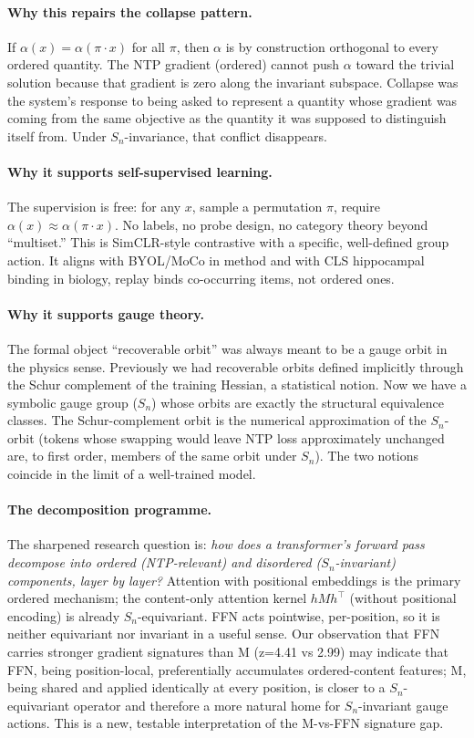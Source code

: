 \documentclass[11pt, a4paper]{article}
\theoremstyle{plain}
\theoremstyle{definition}
\theoremstyle{remark}
\begin{document}
\paragraph{Why this repairs the collapse pattern.}
If $\alpha(x) = \alpha(\pi \cdot x)$ for all $\pi$, then $\alpha$ is by construction orthogonal to every ordered quantity.
The NTP gradient (ordered) cannot push $\alpha$ toward the trivial solution because that gradient is zero along the invariant subspace.
Collapse was the system's response to being asked to represent a quantity whose gradient was coming from the same objective as the quantity it was supposed to distinguish itself from.
Under $S_n$-invariance, that conflict disappears.

\paragraph{Why it supports self-supervised learning.}
The supervision is free: for any $x$, sample a permutation $\pi$, require $\alpha(x) \approx \alpha(\pi \cdot x)$.
No labels, no probe design, no category theory beyond ``multiset.''
This is SimCLR-style contrastive with a specific, well-defined group action.
It aligns with BYOL/MoCo in method and with CLS hippocampal binding in biology, replay binds co-occurring items, not ordered ones.

\paragraph{Why it supports gauge theory.}
The formal object ``recoverable orbit'' was always meant to be a gauge orbit in the physics sense.
Previously we had recoverable orbits defined implicitly through the Schur complement of the training Hessian, a statistical notion.
Now we have a symbolic gauge group ($S_n$) whose orbits are exactly the structural equivalence classes.
The Schur-complement orbit is the numerical approximation of the $S_n$-orbit (tokens whose swapping would leave NTP loss approximately unchanged are, to first order, members of the same orbit under $S_n$).
The two notions coincide in the limit of a well-trained model.

\paragraph{The decomposition programme.}
The sharpened research question is: \emph{how does a transformer's forward pass decompose into ordered (NTP-relevant) and disordered ($S_n$-invariant) components, layer by layer?}
Attention with positional embeddings is the primary ordered mechanism; the content-only attention kernel $h M h^\top$ (without positional encoding) is already $S_n$-equivariant.
FFN acts pointwise, per-position, so it is neither equivariant nor invariant in a useful sense.
Our observation that FFN carries stronger gradient signatures than M (z=4.41 vs 2.99) may indicate that FFN, being position-local, preferentially accumulates ordered-content features; M, being shared and applied identically at every position, is closer to a $S_n$-equivariant operator and therefore a more natural home for $S_n$-invariant gauge actions.
This is a new, testable interpretation of the M-vs-FFN signature gap.
\end{document}
